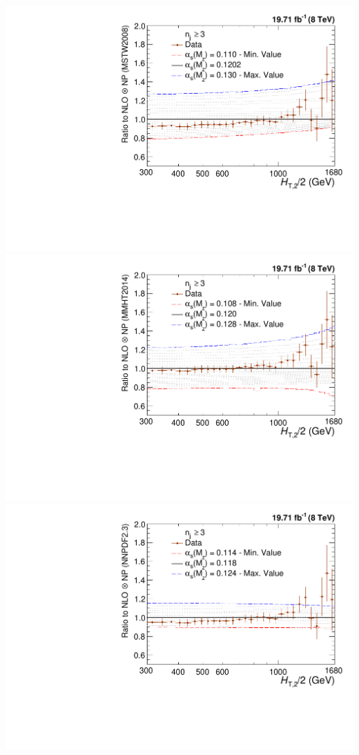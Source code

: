 \documentclass{beamer}
\begin{document}
\begin{frame}
\begin{center}
\includegraphics[scale = 0.207]{Plots_HT_2_150/Sensitivity_3_ratio_NLO_MSTW2008.pdf}\\
\vspace{5mm}
\includegraphics[scale = 0.207]{Plots_HT_2_150/Sensitivity_3_ratio_NLO_MMHT2014.pdf}%
\hspace{0.3mm}
\includegraphics[scale = 0.207]{Plots_HT_2_150/Sensitivity_3_ratio_NLO_NNPDF23.pdf}
\end{center}
\end{frame}
\end{document}
